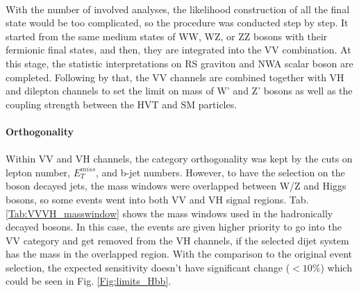 \noindent
\\With the number of involved analyses, the likelihood construction of all the final state would be too complicated, so the procedure was conducted step by step. It started from the same medium states of WW, WZ, or ZZ bosons with their fermionic final states, and then, they are integrated into the VV combination. At this stage, the statistic interpretations on RS graviton and NWA scalar boson are completed. Following by that, the VV channels are combined together with VH and dilepton channels to set the limit on mass of W' and Z' bosons as well as the coupling strength between the HVT and SM particles.  
\\
\\{\bf Orthogonality }
\\
\\Within VV and VH channels, the category orthogonality was kept by the cuts on lepton number, $E^{miss}_T$, and b-jet numbers. However, to have the selection on the boson decayed jets, the mass windows were overlapped between W/Z and Higgs bosons, so some events went into both VV and VH signal regions. Tab. \ref{Tab:VVVH_masswindow} shows the mass windows used in the hadronically decayed bosons. In this case, the events are given higher priority to go into the VV category and get removed from the VH channels, if the selected dijet system has the mass in the overlapped region. With the comparison to the original event selection, the expected sensitivity doesn't have significant change ($<10\%$) which could be seen in Fig. \ref{Fig:limits_Hbb}. 
